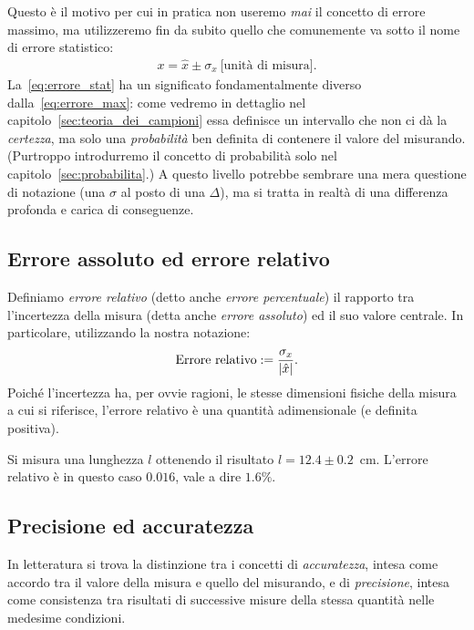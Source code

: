 Questo è il motivo per cui in pratica non useremo \emph{mai} il concetto
di errore massimo, ma utilizzeremo fin da subito quello che comunemente va
sotto il nome di errore statistico:
\begin{align}\label{eq:errore_stat}
  x = \hat{x} \pm \sigma_x~\text{[unità di misura]}.
\end{align}
La~\eqref{eq:errore_stat} ha un significato fondamentalmente diverso
dalla~\eqref{eq:errore_max}: come vedremo in dettaglio nel
capitolo~\ref{sec:teoria_dei_campioni} essa definisce un intervallo che non ci
dà la \emph{certezza}, ma solo una \emph{probabilità} ben definita di
contenere il valore del misurando. (Purtroppo introdurremo il concetto di
probabilità solo nel capitolo~\ref{sec:probabilita}.)
A questo livello potrebbe sembrare una mera questione di notazione (una
$\sigma$ al posto di una $\Delta$), ma si tratta in realtà di una differenza
profonda e carica di conseguenze.


\subsection{Errore assoluto ed errore relativo}
\label{sec:errore_assoluto_relativo}

Definiamo \emph{errore relativo} (detto anche \emph{errore percentuale}) il
rapporto tra l'incertezza della misura (detta anche \emph{errore assoluto}) ed
il suo valore centrale. In particolare, utilizzando la nostra notazione:
\begin{align}\label{eq:errore_max_relativo}
  \text{Errore relativo} := \frac{\sigma_x}{\left| \hat{x} \right|}.
\end{align}
Poiché l'incertezza ha, per ovvie ragioni, le stesse dimensioni fisiche della
misura a cui si riferisce, l'errore relativo è una quantità adimensionale
(e definita positiva).

\begin{examplebox}
  \begin{example}
    Si misura una lunghezza $l$ ottenendo il risultato $l = 12.4 \pm 0.2$~cm.
    L'errore relativo è in questo caso $0.016$, vale a dire $1.6\%$.
  \end{example}
\end{examplebox}


\subsection{Precisione ed accuratezza}

In letteratura si trova la distinzione tra i concetti di \emph{accuratezza},
intesa come accordo tra il valore della misura e quello del misurando, e di
\emph{precisione}, intesa come consistenza tra risultati di successive misure
della stessa quantità nelle medesime condizioni.

